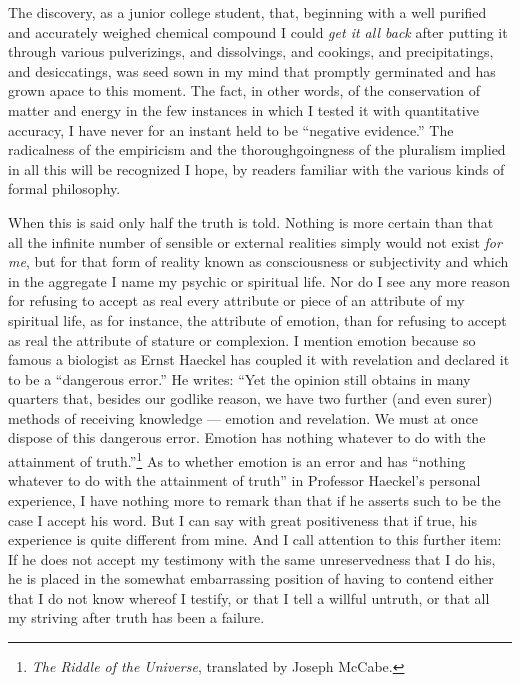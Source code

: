 \documentclass[a4paper, 11pt, oneside, polutonikogreek, english]{article}
\begin{document}
The discovery, as a junior college student, that, beginning with a well purified and accurately weighed chemical compound I could \emph{get it all back} after putting it through various pulverizings, and dissolvings, and cookings, and precipitatings, and desiccatings, was seed sown in my mind that promptly germinated and has grown apace to this moment. The fact, in other words, of the conservation of matter and energy in the few instances in which I tested it with quantitative accuracy, I have never for an instant held to be ``negative evidence.'' The radicalness of the empiricism and the thoroughgoingness of the pluralism implied in all this will be recognized I hope, by readers familiar with the various kinds of formal philosophy.

When this is said only half the truth is told. Nothing is more certain than that all the infinite number of sensible or external realities simply would not exist \emph{for me}, but for that form of reality known as consciousness or subjectivity and which in the aggregate I name my psychic or spiritual life. Nor do I see any more reason for refusing to accept as real every attribute or piece of an attribute of my spiritual life, as for instance, the attribute of emotion, than for refusing to accept as real the attribute of stature or complexion. I mention emotion because so famous a biologist as Ernst Haeckel has coupled it with revelation and declared it to be a ``dangerous error.'' He writes: ``Yet the opinion still obtains in many quarters that, besides our godlike reason, we have two further (and even surer) methods of receiving knowledge --- emotion and revelation. We must at once dispose of this dangerous error. Emotion has nothing whatever to do with the attainment of truth.''\footnote{\emph{The Riddle of the Universe}, translated by Joseph McCabe.} As to whether emotion is an error and has ``nothing whatever to do with the attainment of truth'' in Professor Haeckel's personal experience, I have nothing more to remark than that if he asserts such to be the case I accept his word. But I can say with great positiveness that if true, his experience is quite different from mine. And I call attention to this further item: If he does not accept my testimony with the same unreservedness that I do his, he is placed in the somewhat embarrassing position of having to contend either that I do not know whereof I testify, or that I tell a willful untruth, or that all my striving after truth has been a failure.
\end{document}
